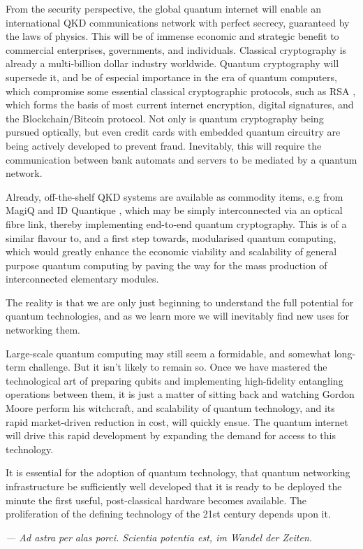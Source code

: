 \documentclass[aps,rmp,twocolumn,amsmath,amssymb,nofootinbib,superscriptaddress,longbibliography,floatfix]{revtex4-1}
\begin{document}
From the security perspective, the global quantum internet will enable an international QKD communications network with perfect secrecy, guaranteed by the laws of physics. This will be of immense economic and strategic benefit to commercial enterprises, governments, and individuals. Classical cryptography is already a multi-billion dollar industry worldwide. Quantum cryptography will supersede it, and be of especial importance in the era of quantum computers, which compromise some essential classical cryptographic protocols, such as RSA \cite{bib:RSA}, which forms the basis of most current internet encryption, digital signatures, and the Blockchain/Bitcoin protocol. Not only is quantum cryptography being pursued optically, but even credit cards with embedded quantum circuitry are being actively developed to prevent fraud. Inevitably, this will require the communication between bank automats and servers to be mediated by a quantum network.

Already, off-the-shelf QKD systems are available as commodity items, e.g from MagiQ \cite{bib:MagiQ} and ID Quantique \cite{bib:IDQuant}, which may be simply interconnected via an optical fibre link, thereby implementing end-to-end quantum cryptography. This is of a similar flavour to, and a first step towards, modularised quantum computing, which would greatly enhance the economic viability and scalability of general purpose quantum computing by paving the way for the mass production of interconnected elementary modules.

The reality is that we are only just beginning to understand the full potential for quantum technologies, and as we learn more we will inevitably find new uses for networking them.

Large-scale quantum computing may still seem a formidable, and somewhat long-term challenge. But it isn't likely to remain so. Once we have mastered the technological art of preparing qubits and implementing high-fidelity entangling operations between them, it is just a matter of sitting back and watching Gordon Moore perform his witchcraft, and scalability of quantum technology, and its rapid market-driven reduction in cost, will quickly ensue. The quantum internet will drive this rapid development by expanding the demand for access to this technology.

It is essential for the adoption of quantum technology, that quantum networking infrastructure be sufficiently well developed that it is ready to be deployed the minute the first useful, post-classical hardware becomes available. The proliferation of the defining technology of the 21st century depends upon it.

%
%

\begin{acknowledgments}
\emph{--- Ad astra per alas porci. Scientia potentia est, im Wandel der Zeiten.}
\end{acknowledgments}

%
%


\end{document}

